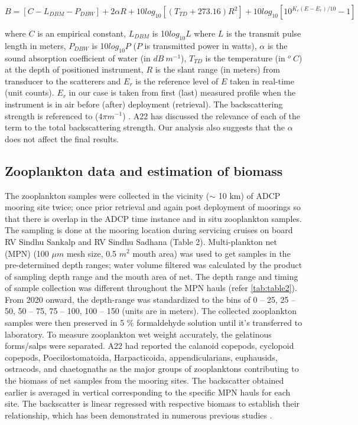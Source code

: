 \documentclass{article}
\begin{document}
	$B = [C - L_{DBM}-P_{DBW}] + 2\alpha R + {10 log_{10}[(T_{TD}+273.16)R^2] } + {10log_{10} [10^{K_c(E-E_r)/10}-1]}$
	
	where $C$ is an empirical constant, $L_{DBM}$ is 10$log_{10}L$ where $L$ is the transmit pulse length in meters, $P_{DBW}$ is 10$log_{10}P$ ($P$ is  transmitted power in watts), $\alpha$ is the sound absorption coefficient of water (in $dB\ m^{-1}$),  $T_{TD}$ is the temperature (in $^o\ C$) at the depth of positioned instrument, $R$  is the slant range (in meters) from transducer to the scatterers and $E_r$ is	the reference level of $E$ taken in real-time (unit counts). $E_r$ in our case is taken from first (last) measured profile when the instrument is in air before (after) deployment (retrieval). The backscattering strength is referenced to ($4\pi m^{-1}$) \citep{deines1999backscatter, mullison2017backscatter}.  A22 has discussed the relevance of each of the term to the total backscattering strength. Our analysis also suggests that the $\alpha$ does not affect the final results. 
	
	\subsection{Zooplankton data and estimation of biomass}
	The  zooplankton  samples were collected in the vicinity ($\sim$ 10 km) of ADCP mooring site twice; once prior retrieval and again post deployment of moorings so that there is overlap in the ADCP time instance and in situ zooplankton samples. The sampling is done at the mooring location during servicing cruises on board RV Sindhu Sankalp and RV Sindhu Sadhana (Table 2). Multi-plankton net (MPN) (100 $\mu m$ mesh size, 0.5 $m^2$ mouth area) was used to get samples in the pre-determined depth ranges; water volume filtered was calculated by the product of sampling depth range and the mouth area of net. The depth range and timing of sample collection was different throughout the MPN hauls (refer \autoref{tab:table2}). From 2020 onward, the depth-range was standardized to the bins of 0 -- 25, 25 -- 50, 50 -- 75, 75 -- 100, 100 -- 150 (units are in meters). The collected zooplankton samples were then preserved in 5 \% formaldehyde solution until it's transferred to laboratory. To measure zooplankton wet weight accurately, the gelatinous forms/salps were separated. A22 had reported the calanoid copepods, cyclopoid copepods, Poecilostomatoida, Harpacticoida, appendicularians, euphausids, ostracods, and
	chaetognaths as the major groups of zooplanktons contributing to the biomass of net samples from the mooring sites. 
	The backscatter obtained earlier is averaged in vertical corresponding to the specific MPN hauls for each site. The backscatter is linear regressed with respective biomass to establish their relationship, which has been demonstrated in numerous previous studies \citep{flagg1989use,heywood1991estimation,jiang2007temporal,aparna2022seasonal}. 
	
\end{document}
